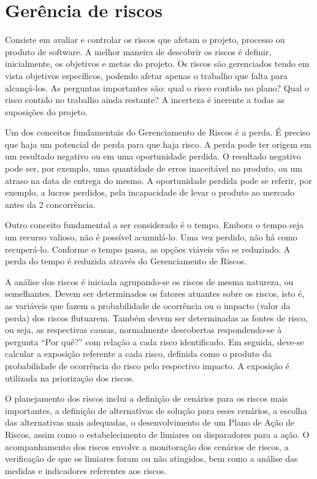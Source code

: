 \documentclass[12pt]{article}
\begin{document}
    \section{Gerência de riscos}
        Consiste em avaliar e controlar os riscos que afetam o projeto, processo ou produto de software. A melhor maneira de descobrir os riscos é definir, inicialmente, os objetivos e metas do projeto. Os riscos são gerenciados tendo em vista objetivos específicos, podendo afetar apenas o trabalho que falta para alcançá-los. As perguntas importantes são: qual o risco contido no plano? Qual o risco contido no trabalho ainda restante? A incerteza é inerente a todas as suposições do projeto.	 
        
        Um dos conceitos fundamentais do Gerenciamento de Riscos é a perda. É preciso que haja um potencial de perda para que haja risco. A perda pode ter origem em um resultado negativo ou em uma oportunidade perdida. O resultado negativo pode ser, por exemplo, uma quantidade de erros inaceitável no produto, ou um atraso na data de entrega do mesmo. A oportunidade perdida pode se referir, por exemplo, a lucros perdidos, pela incapacidade de levar o produto ao mercado antes da 2 concorrência. 
        
        Outro conceito fundamental a ser considerado é o tempo. Embora o tempo seja um recurso valioso, não é possível acumulá-lo. Uma vez perdido, não há como recuperá-lo. Conforme o tempo passa, as opções viáveis vão se reduzindo. A perda do tempo é reduzida através do Gerenciamento de Riscos.

        A análise dos riscos é iniciada agrupando-se os riscos de mesma natureza, ou semelhantes. Devem ser determinados os fatores atuantes sobre os riscos, isto é, as variáveis que fazem a probabilidade de ocorrência ou o impacto (valor da perda) dos riscos flutuarem. Também devem ser determinadas as fontes de risco, ou seja, as respectivas causas, normalmente descobertas respondendo-se à pergunta “Por quê?” com relação a cada risco identificado. Em seguida, deve-se calcular a exposição referente a cada risco, definida como o produto da probabilidade de ocorrência do risco pelo respectivo impacto. A exposição é utilizada na priorização dos riscos. 

        O planejamento dos riscos inclui a definição de cenários para os riscos mais importantes, a definição de alternativas de solução para esses cenários, a escolha das alternativas mais adequadas, o desenvolvimento de um Plano de Ação de Riscos, assim como o estabelecimento de limiares ou disparadores para a ação. O acompanhamento dos riscos envolve a monitoração dos cenários de riscos, a verificação de que os limiares foram ou não atingidos, bem como a análise das medidas e indicadores referentes aos riscos. 
\end{document}
